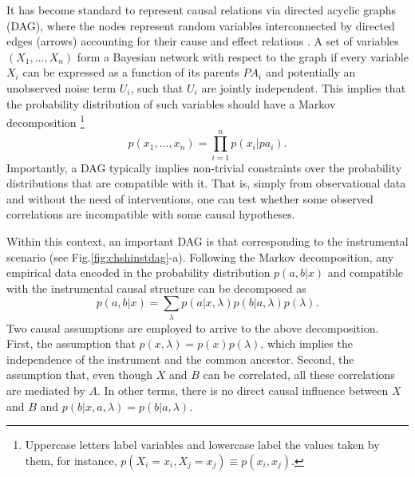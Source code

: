 \documentclass[letterpaper]{article}
\begin{document}
It has become standard to represent causal relations via directed acyclic graphs
(DAG), where the nodes represent random variables interconnected by directed
edges (arrows) accounting for their cause and effect relations \cite{pearlbook}.
A set of variables  $\left( X_1,\dots, X_n \right)$ form a Bayesian network with
respect to the graph if every variable $X_i$ can be expressed as a function of
its parents $PA_i$ and potentially an unobserved noise term $U_i$, such that
$U_i$ are jointly independent. This implies that the probability distribution of
such variables should have a Markov decomposition 
\footnote{Uppercase letters label variables and lowercase label the values taken
by them, for instance, $p(X_i =x_i, X_j = x_j) \equiv p(x_i, x_j)$.}
\begin{equation}
p(x_1,\dots,x_n)= \prod_{i=1}^{n} p(x_i \vert pa_i).    
\end{equation}
Importantly, a DAG typically implies non-trivial constraints over the
probability distributions that are compatible with it. That is, simply from
observational data and without the need of interventions, one can test whether
some observed correlations are incompatible with some causal hypotheses.


Within this context, an important DAG is that corresponding to the instrumental
scenario (see Fig.\ref{fig:chshinstdag}-a). Following the Markov decomposition, any
empirical data encoded in the probability distribution $p(a,b \vert x)$ and
compatible with the instrumental causal structure can be decomposed as
\begin{equation}
p(a,b \vert x) = \sum_{\lambda} p(a\vert x,\lambda) p(b\vert a,\lambda)p(\lambda).
\end{equation}
Two causal assumptions are employed to arrive to the above decomposition. First,
the assumption that $p(x,\lambda)=p(x)p(\lambda)$, which implies the independence of
the instrument and the common ancestor. Second, the assumption that, even though
$X$ and $B$ can be correlated, all these correlations are mediated by $A$. In
other terms, there is no direct causal influence between $X$ and $B$ and
$p(b\vert x,a,\lambda)=p(b\vert a,\lambda)$.
\end{document}
